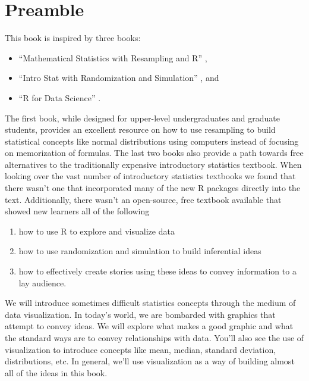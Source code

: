 \documentclass[]{tufte-book}
\providecommand{\tightlist}{%
  \setlength{\itemsep}{0pt}\setlength{\parskip}{0pt}}
\begin{document}
\section{Preamble}\label{preamble}

This book is inspired by three books:

\begin{itemize}
\tightlist
\item
  ``Mathematical Statistics with Resampling and R'' \citep{hester2011},
\item
  ``Intro Stat with Randomization and Simulation'' \citep{isrs2014}, and
\item
  ``R for Data Science'' \citep{rds2016}.
\end{itemize}

The first book, while designed for upper-level undergraduates and
graduate students, provides an excellent resource on how to use
resampling to build statistical concepts like normal distributions using
computers instead of focusing on memorization of formulas. The last two
books also provide a path towards free alternatives to the traditionally
expensive introductory statistics textbook. When looking over the vast
number of introductory statistics textbooks we found that there wasn't
one that incorporated many of the new R packages directly into the text.
Additionally, there wasn't an open-source, free textbook available that
showed new learners all of the following

\begin{enumerate}
\def\labelenumi{\arabic{enumi}.}
\tightlist
\item
  how to use R to explore and visualize data
\item
  how to use randomization and simulation to build inferential ideas
\item
  how to effectively create stories using these ideas to convey
  information to a lay audience.
\end{enumerate}

We will introduce sometimes difficult statistics concepts through the
medium of data visualization. In today's world, we are bombarded with
graphics that attempt to convey ideas. We will explore what makes a good
graphic and what the standard ways are to convey relationships with
data. You'll also see the use of visualization to introduce concepts
like mean, median, standard deviation, distributions, etc. In general,
we'll use visualization as a way of building almost all of the ideas in
this book.
\end{document}
